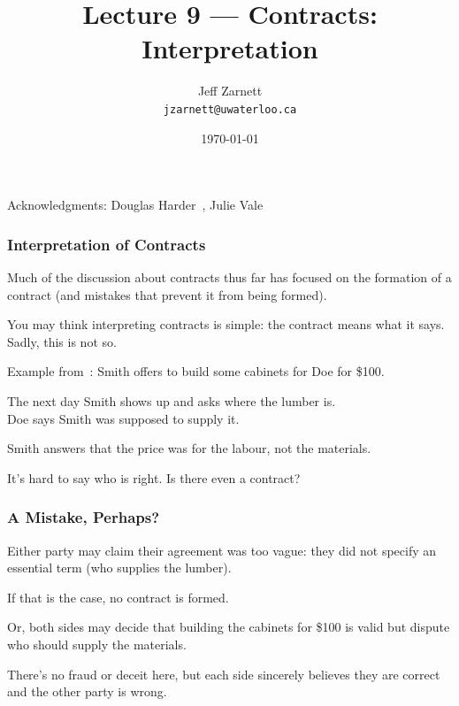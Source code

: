 

\title{Lecture 9 --- Contracts: Interpretation }

\author{Jeff Zarnett \\ \small \texttt{jzarnett@uwaterloo.ca}}
\date{\today}




\begin{frame}
  \titlepage

\begin{center}
  \small{Acknowledgments: Douglas Harder~\cite{dwh}, Julie Vale~\cite{jv}}
  \end{center}
\end{frame}



\begin{frame}
\frametitle{Interpretation of Contracts}

Much of the discussion about contracts thus far has focused on the formation of a contract (and mistakes that prevent it from being formed).

You may think interpreting contracts is simple: the contract means what it says.\\ 
\quad Sadly, this is not so.

Example from~\cite{lba}: Smith offers to build some cabinets for Doe for \$100.

The next day Smith shows up and asks where the lumber is.\\
\quad Doe says Smith was supposed to supply it.

Smith answers that the price was for the labour, not the materials.

It's hard to say who is right. Is there even a contract?

\end{frame}



\begin{frame}
\frametitle{A Mistake, Perhaps?}

Either party may claim their agreement was too vague: they did not specify an essential term (who supplies the lumber).

If that is the case, no contract is formed.

Or, both sides may decide that building the cabinets for \$100 is valid but dispute who should supply the materials.

There's no fraud or deceit here, but each side sincerely believes they are correct and the other party is wrong.

\end{frame}



